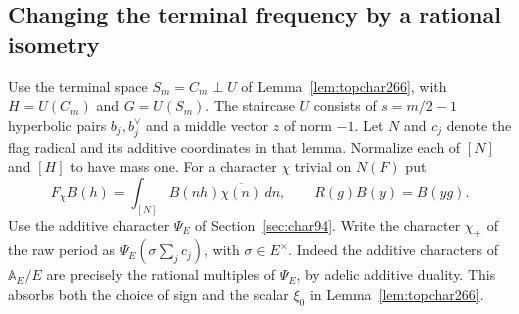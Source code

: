 \documentclass[a4paper,11pt]{article}
\theoremstyle{definition}
\theoremstyle{remark}
\numberwithin{equation}{section}
\begin{document}
\subsection{Changing the terminal frequency by a rational isometry}\label{nav:VI-45}
Use the terminal space \(S_m=C_m\perp U\) of
Lemma~\ref{lem:topchar266}, with \(H=U(C_m)\) and
\(G=U(S_m)\). The staircase \(U\) consists of \(s=m/2-1\)
hyperbolic pairs \(b_j,b_j^\vee\) and a middle vector \(z\) of norm
\(-1\). Let \(N\) and \(c_j\) denote the flag radical and its
additive coordinates in that lemma. Normalize each of \([N]\)
and \([H]\) to have mass one. For a character \(\chi\) trivial on
\(N(F)\) put
\[
 F_\chi B(h)=\int_{[N]} B(nh)\overline{\chi(n)}\,dn,
 \qquad R(g)B(y)=B(yg).
\]
Use the additive character \(\Psi_E\) of Section~\ref{sec:char94}.
Write the character \(\chi_+\) of the raw period as
\(\Psi_E(\sigma\sum_jc_j)\), with \(\sigma\in E^\times\).
Indeed the additive characters of \(\mathbb A_E/E\) are precisely
the rational multiples of \(\Psi_E\), by adelic additive duality.
This absorbs both the choice of sign and the scalar \(\xi_0\)
in Lemma~\ref{lem:topchar266}.
\end{document}
